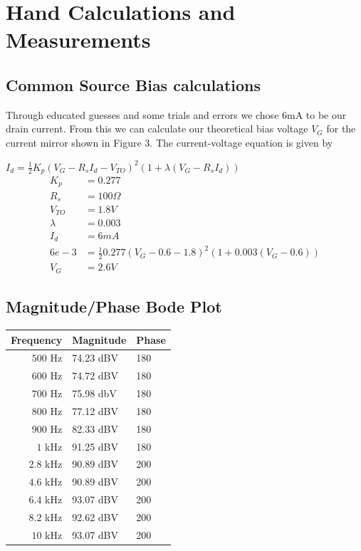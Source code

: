 \documentclass[11pt, twoside, letterpaper]{article}
\begin{document}
\section{Hand Calculations and Measurements}
\subsection{Common Source Bias calculations}
Through educated guesses and some trials and errors we chose 6mA to be our drain current. From this we can calculate our theoretical bias voltage
$V_G$ for the current mirror shown in Figure 3. The current-voltage equation is given by

$I_d = \frac{1}{2} K_p (V_G - R_s I_d -V_{TO})^2 (1 + \lambda (V_G - R_s I_d))$
\begin{align*}
K_p &= 0.277\\
R_s &= 100\Omega\\
V_{TO} &= 1.8V\\
\lambda &= 0.003\\
I_d &= 6mA\\
6e-3 &= \frac{1}{2}0.277(V_G-0.6-1.8)^2(1+0.003(V_G-0.6))\\
V_G &= 2.6V
\end{align*}

\subsection*{Magnitude/Phase Bode Plot}

\begin{tabular}{|r|l|l|}
\hline
Frequency & Magnitude & Phase\\
\hline
$500$ Hz & 74.23 dBV & 180 \\
$600$ Hz & 74.72 dBV & 180 \\
$700$ Hz & 75.98 dbV & 180 \\
$800$ Hz & 77.12 dBV & 180 \\
$900$ Hz & 82.33 dBV & 180 \\
$1$ kHz & 91.25 dBV & 180 \\
$2.8$ kHz & 90.89 dBV & 200 \\
$4.6$ kHz & 90.89 dBV & 200 \\
$6.4$ kHz& 93.07 dBV & 200 \\
$8.2$ kHz & 92.62 dBV & 200 \\
$10$  kHz& 93.07 dBV & 200 \\
\hline
\end{tabular}
\end{document}

